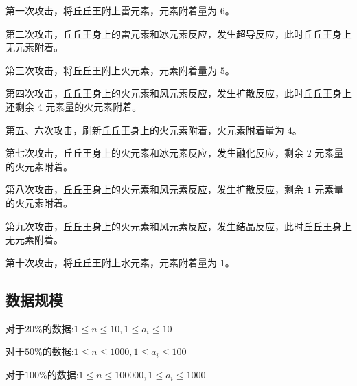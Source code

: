 第一次攻击，将丘丘王附上雷元素，元素附着量为 $6$。

第二次攻击，丘丘王身上的雷元素和冰元素反应，发生超导反应，此时丘丘王身上无元素附着。

第三次攻击，将丘丘王附上火元素，元素附着量为 $5$。

第四次攻击，丘丘王身上的火元素和风元素反应，发生扩散反应，此时丘丘王身上还剩余 $4$ 元素量的火元素附着。

第五、六次攻击，刷新丘丘王身上的火元素附着，火元素附着量为 $4$。

第七次攻击，丘丘王身上的火元素和冰元素反应，发生融化反应，剩余 $2$ 元素量的火元素附着。

第八次攻击，丘丘王身上的火元素和风元素反应，发生扩散反应，剩余 $1$ 元素量的火元素附着。

第九次攻击，丘丘王身上的火元素和风元素反应，发生结晶反应，此时丘丘王身上无元素附着。

第十次攻击，将丘丘王附上水元素，元素附着量为 $1$。

\subsection*{数据规模}

对于$20 \%$的数据:$1 \leq n \leq 10,1 \leq a_i \leq 10$

对于$50 \%$的数据:$1 \leq n \leq 1000,1 \leq a_i \leq 100$

对于$100 \%$的数据:$1 \leq n \leq 100000,1 \leq a_i \leq 1000$

